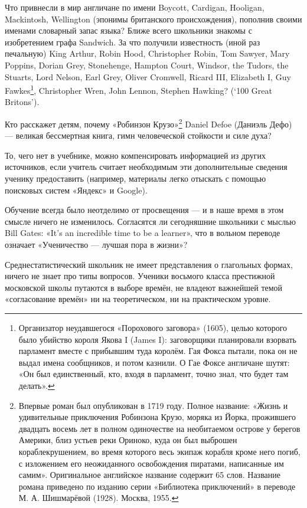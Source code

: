 Что привнесли в мир англичане по имени Boycott, Cardigan, Hooligan, Mackintosh, Wellington (эпонимы британского происхождения), пополнив своими именами словарный запас языка? Ближе всего школьники знакомы с изобретением графа Sandwich. За что получили известность (иной раз печальную) King Arthur, Robin Hood, Christopher Robin, Tom Sawyer, Mary Poppins, Dorian Grey, Stonehenge, Hampton Court, Windsor, the Tudors, the Stuarts, Lord Nelson, Earl Grey, Oliver Cromwell, Ricard III, Elizabeth I, Guy Fawkes\footnote{Организатор неудавшегося «Порохового заговора» (1605), целью которого было убийство короля Якова I (James I): заговорщики планировали взорвать парламент вместе с прибывшим туда королём. Гая Фокса пытали, пока он не выдал имена сообщников, и потом казнили. О Гае Фоксе англичане шутят: «Он был единственный, кто, входя в парламент, точно знал, что будет там делать».}, Christopher Wren, John Lennon, Stephen Hawking? (`100 Great Britons').

Кто расскажет детям, почему «Робинзон Крузо»\footnote{Впервые роман был опубликован в 1719 году. Полное название: «Жизнь и удивительные приключения Робинзона Крузо, моряка из Йорка, прожившего двадцать восемь лет в полном одиночестве на необитаемом острове у берегов Америки, близ устьев реки Ориноко, куда он был выброшен кораблекрушением, во время которого весь экипаж корабля кроме него погиб, с изложением его неожиданного освобождения пиратами, написанные им самим». Оригинальное английское название содержит 65 слов. Название романа приведено по изданию серии «Библиотека приключений» в переводе М. А. Шишмарёвой (1928). Москва, 1955.} Daniel Defoe (Даниэль Дефо) --- великая бессмертная книга, гимн человеческой стойкости и силе духа?

То, чего нет в учебнике, можно компенсировать информацией из других источников, если учитель считает необходимым эти дополнительные сведения ученику предоставить (например, материалы легко отыскать с помощью поисковых систем «Яндекс» и Google).

Обучение всегда было неотделимо от просвещения --- и в наше время в этом смысле ничего не изменилось. Согласятся ли сегодняшние школьники с мыслью Bill Gates: «It’s an incredible time to be a learner», что в вольном переводе означает «Ученичество --- лучшая пора в жизни»?

Среднестатистический школьник не имеет представления о глагольных формах, ничего не знает про типы вопросов. Ученики восьмого класса престижной московской школы путаются в выборе времён, не владеют важнейшей темой «согласование времён» ни на теоретическом, ни на практическом уровне.

